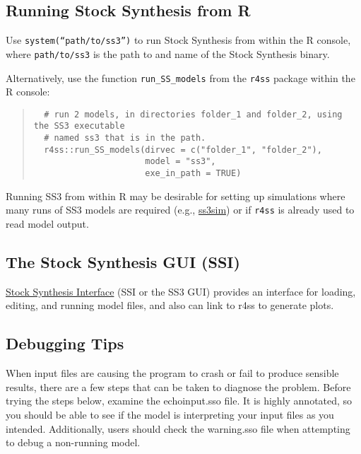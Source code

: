 \subsection{Running Stock Synthesis from R}

Use \texttt{system(``path/to/ss3'')} to run Stock Synthesis from within the R console, where \texttt{path/to/ss3} is the path to and name of the Stock Synthesis binary.

Alternatively, use the function \texttt{run\_SS\_models} from the \texttt{r4ss} package within the R console:

\begin{quote}
  \begin{verbatim}
  # run 2 models, in directories folder_1 and folder_2, using the SS3 executable
  # named ss3 that is in the path.
  r4ss::run_SS_models(dirvec = c("folder_1", "folder_2"),
                      model = "ss3",
                      exe_in_path = TRUE)
  \end{verbatim}
\end{quote}

Running SS3 from within R may be desirable for setting up simulations where many runs of SS3 models are required (e.g., \href{https://github.com/ss3sim/ss3sim}{ss3sim}) or if \texttt{r4ss} is already used to read model output.

\subsection{The Stock Synthesis GUI (SSI)}
\href{https://vlab.noaa.gov/web/stock-synthesis/document-library/-/document_library/0LmuycloZeIt/view/5042951}{Stock Synthesis Interface} (SSI or the SS3 GUI) provides an interface for loading, editing, and running model files, and also can link to r4ss to generate plots.

\subsection{Debugging Tips}
When input files are causing the program to crash or fail to produce sensible results, there are a few steps that can be taken to diagnose the problem.  Before trying the steps below, examine the echoinput.sso file.  It is highly annotated, so you should be able to see if the model is interpreting your input files as you intended.  Additionally, users should check the warning.sso file when attempting to debug a non-running model.

